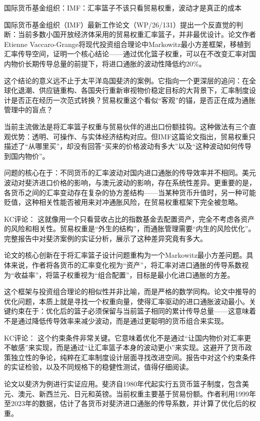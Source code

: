 \documentclass[11pt]{ctexart}
\begin{document}
国际货币基金组织：IMF：汇率篮子不该只看贸易权重，波动才是真正的成本

国际货币基金组织（IMF）最新工作论文（WP/26/131）提出一个反直觉的判断：当前多数小国开放经济体采用的贸易权重汇率篮子，并非最优设计。论文作者Etienne Vaccaro-Grange将现代投资组合理论中Markowitz最小方差框架，移植到汇率传导空间，证明一个核心结论——通过优化篮子权重，可以在不改变汇率对国内物价长期传导总量的前提下，将进口通胀的波动性降低约20\%。

这个结论的意义远不止于太平洋岛国斐济的案例。它指向一个更深层的追问：在全球化退潮、供应链重构、各国央行重新审视物价稳定目标的大背景下，汇率制度设计是否正在经历一次范式转换？贸易权重这个看似“客观”的锚，是否正在成为通胀管理中的盲点？

当前主流做法是将汇率篮子权重与贸易伙伴的进出口份额挂钩。这种做法有三个直观优势：透明、可操作、与实体经济结构对应。但IMF这篇论文指出，贸易权重只描述了“从哪里买”，却没有回答“买来的价格波动有多大”以及“这种波动如何传导到国内物价”。

问题的核心在于：不同货币的汇率波动对国内进口通胀的传导效率并不相同。美元波动对斐济进口价格的影响，与澳元波动的影响，存在系统性差异。更重要的是，各货币之间的汇率变动存在复杂的协方差结构——当某种货币升值时，另一种可能贬值，这种相关性能否被用来对冲通胀风险，在贸易权重框架下完全被忽略。

KC评论： 这就像用一个只看营收占比的指数基金去配置资产，完全不考虑各资产的风险和相关性。贸易权重是“外生的结构”，而通胀管理需要“内生的风险优化”。完整报告中对斐济案例的实证分析，展示了这种差异究竟有多大。

论文的核心创新在于将汇率篮子设计问题重构为一个Markowitz最小方差问题。具体来说，作者将各货币的汇率变化视为“资产”，将汇率对进口通胀的传导系数视为“收益率”，将篮子权重视为“组合配置”，目标是最小化进口通胀的方差。

这个框架与投资组合理论的相似性并非比喻，而是严格的数学同构。论文中推导的优化问题，本质上就是寻找一个权重向量，使得汇率驱动的进口通胀波动最小。关键约束在于：优化后的篮子必须保留与当前篮子相同的累计传导总量——这意味着不是通过降低传导效率来减少波动，而是通过更聪明的货币组合来实现。

KC评论： 这个约束条件非常关键。它意味着优化不是通过“让国内物价对汇率更不敏感”来实现，而是通过“让汇率篮子本身的波动更小”来实现。这避开了货币政策独立性的争论，纯粹在汇率制度设计层面寻找改进空间。报告中对这个约束条件的实证检验，以及不同规格下的稳健性测试，值得仔细阅读。

论文以斐济为例进行实证应用。斐济自1980年代起实行五货币篮子制度，包含美元、澳元、新西兰元、日元和英镑。当前权重主要基于贸易份额。作者利用1999年至2023年的数据，估计了各货币对斐济进口通胀的传导系数，并计算了优化后的权重。
\end{document}
